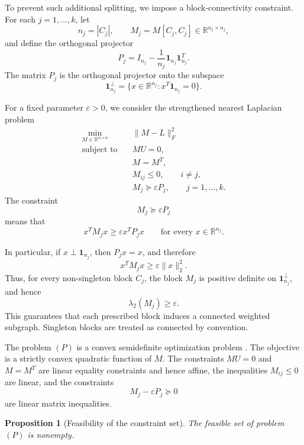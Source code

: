 \documentclass[11pt]{article}
\newtheorem{proposition}{Proposition}
\begin{document}
	To prevent such additional splitting, we impose a block-connectivity constraint.
	For each $j=1,\ldots,k$, let
	\[
	n_j=|C_j|,
	\qquad
	M_j=M[C_j,C_j]\in\mathbb R^{n_j\times n_j},
	\]
	and define the orthogonal projector
	\[
	P_j
	=
	I_{n_j}
	-
	\frac{1}{n_j}\mathbf 1_{n_j}\mathbf 1_{n_j}^T.
	\]
	The matrix $P_j$ is the orthogonal projector onto the subspace
	\[
	\mathbf 1_{n_j}^{\perp}
	=
	\{x\in\mathbb R^{n_j}:x^T\mathbf 1_{n_j}=0\}.
	\]
	
	For a fixed parameter $\varepsilon>0$, we consider the strengthened nearest
	Laplacian problem
	\[
	\begin{aligned}
		\min_{M\in\mathbb R^{n\times n}}\quad
		&\|M-L\|_F^2\\
		\text{subject to}\quad
		&MU=0,\\
		&M=M^T,\\
		&M_{ij}\le0,\qquad i\ne j,\\
		&M_j\succeq \varepsilon P_j,\qquad j=1,\ldots,k.
	\end{aligned}
	\tag{P}
	\]
	The constraint
	\[
	M_j\succeq\varepsilon P_j
	\] 
	means that
	\[
	x^TM_jx\ge \varepsilon x^TP_jx
	\qquad
	\text{for every }x\in\mathbb R^{n_j}.
	\]
    
	In particular, if $x\perp\mathbf 1_{n_j}$, then $P_jx=x$, and therefore
	\[
	x^TM_jx\ge \varepsilon\|x\|_2^2.
	\]
	Thus, for every non-singleton block $C_j$, the block $M_j$ is positive definite
	on $\mathbf 1_{n_j}^{\perp}$, and hence
	\[
	\lambda_2(M_j)\ge\varepsilon.
	\]
	This guarantees that each prescribed block induces a connected weighted
	subgraph. Singleton blocks are treated as connected by convention.
	
	The problem $(P)$ is a convex semidefinite optimization problem {\cite{BoydVandenberghe2004}}. The objective is
	a strictly convex quadratic function of $M$. The constraints $MU=0$ and $M=M^T$
	are linear equality constraints and hence affine, the inequalities $M_{ij}\le0$ are linear, and the constraints
	\[
	M_j-\varepsilon P_j\succeq0
	\]
	are linear matrix inequalities.
	
	\begin{proposition}[Feasibility of the constraint set]
		The feasible set of problem $(P)$ is nonempty.
	\end{proposition}
	
\end{document}

